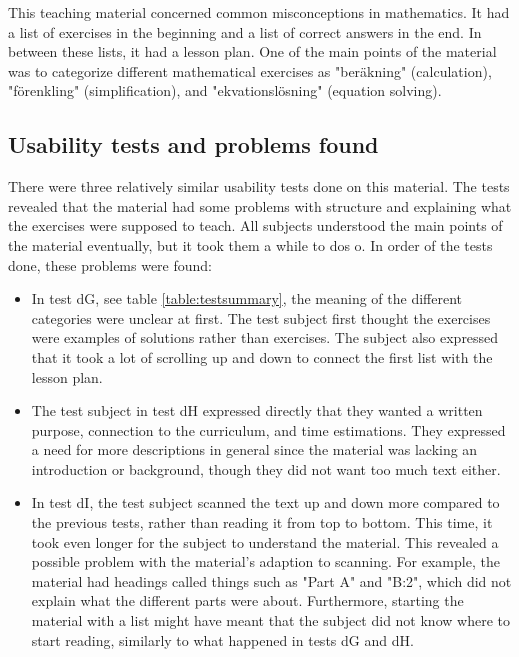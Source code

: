 This teaching material concerned common misconceptions in mathematics. It had a list of exercises in the beginning and a list of correct answers in the end. In between these lists, it had a lesson plan. One of the main points of the material was to categorize different mathematical exercises as "beräkning" (calculation), "förenkling" (simplification), and "ekvationslösning" (equation solving).


\subsection{Usability tests and problems found}

There were three relatively similar usability tests done on this material. The tests revealed that the material had some problems with structure and explaining what the exercises were supposed to teach. All subjects understood the main points of the material eventually, but it took them a while to dos o. In order of the tests done, these problems were found:

\begin{itemize}
  \item In test dG, see table \ref{table:testsummary}, the meaning of the different categories were unclear at first. The test subject first thought the exercises were examples of solutions rather than exercises. The subject also expressed that it took a lot of scrolling up and down to connect the first list with the lesson plan.
  \item The test subject in test dH expressed directly that they wanted a written purpose, connection to the curriculum, and time estimations. They expressed a need for more descriptions in general since the material was lacking an introduction or background, though they did not want too much text either.
  \item In test dI, the test subject scanned the text up and down more compared to the previous tests, rather than reading it from top to bottom. This time, it took even longer for the subject to understand the material. This revealed a possible problem with the material's adaption to scanning. For example, the material had headings called things such as "Part A" and "B:2", which did not explain what the different parts were about. Furthermore, starting the material with a list might have meant that the subject did not know where to start reading, similarly to what happened in tests dG and dH.
\end{itemize}

